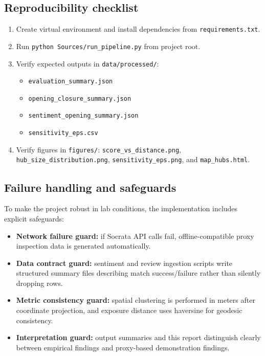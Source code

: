 \documentclass[10pt,twocolumn]{article}
\begin{document}
\subsection{Reproducibility checklist}
\begin{enumerate}
\item Create virtual environment and install dependencies from \texttt{requirements.txt}.
\item Run \texttt{python Sources/run\_pipeline.py} from project root.
\item Verify expected outputs in \texttt{data/processed/}:
\begin{itemize}
\item \texttt{evaluation\_summary.json}
\item \texttt{opening\_closure\_summary.json}
\item \texttt{sentiment\_opening\_summary.json}
\item \texttt{sensitivity\_eps.csv}
\end{itemize}
\item Verify figures in \texttt{figures/}:
\texttt{score\_vs\_distance.png}, \texttt{hub\_size\_distribution.png}, \texttt{sensitivity\_eps.png}, and \texttt{map\_hubs.html}.
\end{enumerate}

\subsection{Failure handling and safeguards}
To make the project robust in lab conditions, the implementation includes explicit safeguards:
\begin{itemize}
\item \textbf{Network failure guard:} if Socrata API calls fail, offline-compatible proxy inspection data is generated automatically.
\item \textbf{Data contract guard:} sentiment and review ingestion scripts write structured summary files describing match success/failure rather than silently dropping rows.
\item \textbf{Metric consistency guard:} spatial clustering is performed in meters after coordinate projection, and exposure distance uses haversine for geodesic consistency.
\item \textbf{Interpretation guard:} output summaries and this report distinguish clearly between empirical findings and proxy-based demonstration findings.
\end{itemize}
\end{document}
